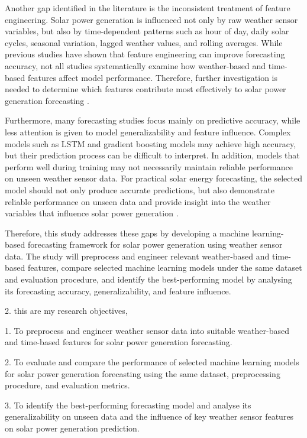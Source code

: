 Another gap identified in the literature is the inconsistent treatment of feature engineering. Solar power generation is influenced not only by raw weather sensor variables, but also by time-dependent patterns such as hour of day, daily solar cycles, seasonal variation, lagged weather values, and rolling averages. While previous studies have shown that feature engineering can improve forecasting accuracy, not all studies systematically examine how weather-based and time-based features affect model performance. Therefore, further investigation is needed to determine which features contribute most effectively to solar power generation forecasting \parencite{JnanaVarshitha2025, Pongphaw2025, TsaiLo2025}.

Furthermore, many forecasting studies focus mainly on predictive accuracy, while less attention is given to model generalizability and feature influence. Complex models such as LSTM and gradient boosting models may achieve high accuracy, but their prediction process can be difficult to interpret. In addition, models that perform well during training may not necessarily maintain reliable performance on unseen weather sensor data. For practical solar energy forecasting, the selected model should not only produce accurate predictions, but also demonstrate reliable performance on unseen data and provide insight into the weather variables that influence solar power generation \parencite{Eren2025, Levent2025, Ozdemir2025}.

Therefore, this study addresses these gaps by developing a machine learning-based forecasting framework for solar power generation using weather sensor data. The study will preprocess and engineer relevant weather-based and time-based features, compare selected machine learning models under the same dataset and evaluation procedure, and identify the best-performing model by analysing its forecasting accuracy, generalizability, and feature influence.

2. this are my research objectives,

1. To preprocess and engineer weather sensor data into suitable weather-based and time-based features for solar power generation forecasting.

2. To evaluate and compare the performance of selected machine learning models for solar power generation forecasting using the same dataset, preprocessing procedure, and evaluation metrics.

3. To identify the best-performing forecasting model and analyse its generalizability on unseen data and the influence of key weather sensor features on solar power generation prediction.


